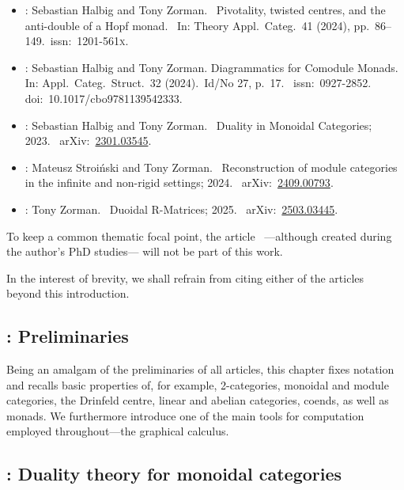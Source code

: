 \begin{itemize}
  \item\cite{halbig24:pivot-hopf}:
  Sebastian Halbig and Tony Zorman.\ %
  Pivotality, twisted centres, and the anti\hyp{}double of a Hopf monad.\ %
  In: Theory Appl.~Categ.~41 (2024), pp.~86–149.\ issn:~1201-561\textsc{x}.
  \item\cite{halbig23:diagr-comod-monad}:
  Sebastian Halbig and Tony Zorman. Diagrammatics for Comodule Monads.\ %
  In: Appl.~Categ.~Struct.~32 (2024).\ Id/No 27, p.~17.\ %
  issn:~0927-2852.\ %
  doi:~10.1017/cbo9781139542333.
  \item\cite{halbig23:dualit-monoid-categ}:
  Sebastian Halbig and Tony Zorman.\ %
  Duality in Monoidal Categories; 2023.\ %
  arXiv:~\href{https://arxiv.org/abs/2301.03545}{2301.03545}.
  \item\cite{stroinski2024:reconstr}:
  Mateusz Stroiński and Tony Zorman.\ %
  Reconstruction of module categories in the infinite and non-rigid settings; 2024.\ %
  arXiv:~\href{https://arxiv.org/abs/2409.00793}{2409.00793}.
  \item\cite{zorman25:duoid-r-matric}:
  Tony Zorman.\ %
  Duoidal R-Matrices; 2025.\ %
  arXiv:~\href{https://arxiv.org/abs/2503.03445}{2503.03445}.
\end{itemize}
To keep a common thematic focal point, the article~\cite{coulembier25:simpl}%
—although created during the author's PhD studies—%
will not be part of this work.

\bigskip
In the interest of brevity, we shall refrain from citing either of the articles%
~\cite{%
  halbig23:dualit-monoid-categ,%
  halbig23:diagr-comod-monad,%
  halbig24:pivot-hopf,%
  stroinski2024:reconstr,%
  zorman25:duoid-r-matric%
}
beyond this introduction.

\subsection*{: Preliminaries}

Being an amalgam of the preliminaries of all articles,
this chapter fixes notation
and recalls basic properties of, for example,
2-categories,
monoidal and module categories,
the Drinfeld centre,
linear and abelian categories,
coends,
as well as monads.
We furthermore introduce one of the main tools for computation employed throughout—the graphical calculus.

\subsection*{: Duality theory for monoidal categories}

